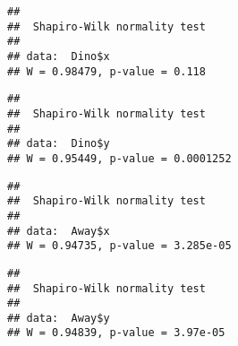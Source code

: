 \documentclass[
]{article}
\newenvironment{Shaded}{\begin{snugshade}}{\end{snugshade}}
\newcommand{\FunctionTok}[1]{\textcolor[rgb]{0.13,0.29,0.53}{\textbf{#1}}}
\newcommand{\NormalTok}[1]{#1}
\newcommand{\OtherTok}[1]{\textcolor[rgb]{0.56,0.35,0.01}{#1}}
\newcommand{\SpecialCharTok}[1]{\textcolor[rgb]{0.81,0.36,0.00}{\textbf{#1}}}
\newcommand{\StringTok}[1]{\textcolor[rgb]{0.31,0.60,0.02}{#1}}
\begin{document}
\begin{verbatim}
## 
##  Shapiro-Wilk normality test
## 
## data:  Dino$x
## W = 0.98479, p-value = 0.118
\end{verbatim}

\begin{Shaded}
\end{Shaded}

\begin{verbatim}
## 
##  Shapiro-Wilk normality test
## 
## data:  Dino$y
## W = 0.95449, p-value = 0.0001252
\end{verbatim}

\begin{Shaded}
\end{Shaded}

\begin{verbatim}
## 
##  Shapiro-Wilk normality test
## 
## data:  Away$x
## W = 0.94735, p-value = 3.285e-05
\end{verbatim}

\begin{Shaded}
\end{Shaded}

\begin{verbatim}
## 
##  Shapiro-Wilk normality test
## 
## data:  Away$y
## W = 0.94839, p-value = 3.97e-05
\end{verbatim}

\begin{Shaded}
\end{Shaded}
\end{document}
